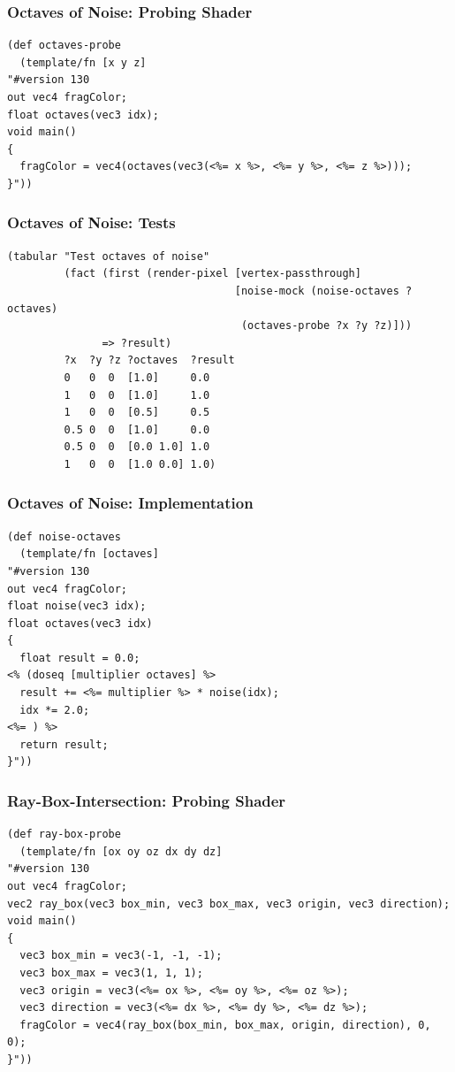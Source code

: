 \documentclass[aspectratio=169,11pt,xcolor=dvipsnames]{beamer}
\begin{document}
\begin{frame}[fragile]
  \frametitle{Octaves of Noise: Probing Shader}
  \begin{verbatim}
(def octaves-probe
  (template/fn [x y z]
"#version 130
out vec4 fragColor;
float octaves(vec3 idx);
void main()
{
  fragColor = vec4(octaves(vec3(<%= x %>, <%= y %>, <%= z %>)));
}"))
  \end{verbatim}
\end{frame}

\begin{frame}[fragile]
  \frametitle{Octaves of Noise: Tests}
  \begin{verbatim}
(tabular "Test octaves of noise"
         (fact (first (render-pixel [vertex-passthrough]
                                    [noise-mock (noise-octaves ?octaves)
                                     (octaves-probe ?x ?y ?z)]))
               => ?result)
         ?x  ?y ?z ?octaves  ?result
         0   0  0  [1.0]     0.0
         1   0  0  [1.0]     1.0
         1   0  0  [0.5]     0.5
         0.5 0  0  [1.0]     0.0
         0.5 0  0  [0.0 1.0] 1.0
         1   0  0  [1.0 0.0] 1.0)
  \end{verbatim}
\end{frame}

\begin{frame}[fragile]
  \frametitle{Octaves of Noise: Implementation}
  \begin{verbatim}
(def noise-octaves
  (template/fn [octaves]
"#version 130
out vec4 fragColor;
float noise(vec3 idx);
float octaves(vec3 idx)
{
  float result = 0.0;
<% (doseq [multiplier octaves] %>
  result += <%= multiplier %> * noise(idx);
  idx *= 2.0;
<%= ) %>
  return result;
}"))
  \end{verbatim}
\end{frame}

\begin{frame}[fragile]
  \frametitle{Ray-Box-Intersection: Probing Shader}
  \begin{verbatim}
(def ray-box-probe
  (template/fn [ox oy oz dx dy dz]
"#version 130
out vec4 fragColor;
vec2 ray_box(vec3 box_min, vec3 box_max, vec3 origin, vec3 direction);
void main()
{
  vec3 box_min = vec3(-1, -1, -1);
  vec3 box_max = vec3(1, 1, 1);
  vec3 origin = vec3(<%= ox %>, <%= oy %>, <%= oz %>);
  vec3 direction = vec3(<%= dx %>, <%= dy %>, <%= dz %>);
  fragColor = vec4(ray_box(box_min, box_max, origin, direction), 0, 0);
}"))
  \end{verbatim}
\end{frame}
\end{document}
